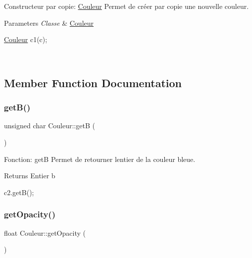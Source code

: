 Constructeur par copie\+: \hyperlink{classCouleur}{Couleur} Permet de créer par copie une nouvelle couleur. 


\begin{DoxyParams}{Parameters}
{\em Classe} & \hyperlink{classCouleur}{Couleur} 
\begin{DoxyCode}
\hyperlink{classCouleur}{Couleur} c1(c);
\end{DoxyCode}
 \\
\hline
\end{DoxyParams}


\subsection{Member Function Documentation}
\mbox{\label{classCouleur_aab24066e81089a96d15bcb04aa2c77df}} 
\subsubsection{\texorpdfstring{get\+B()}{getB()}}
{\footnotesize\ttfamily unsigned char Couleur\+::getB (\begin{DoxyParamCaption}{ }\end{DoxyParamCaption})}



Fonction\+: getB Permet de retourner l\textquotesingle{}entier de la couleur bleue. 

\begin{DoxyReturn}{Returns}
Entier b 
\begin{DoxyCode}
c2.getB();
\end{DoxyCode}
 
\end{DoxyReturn}
\mbox{\label{classCouleur_afb394e815103a2245bc5c3b5b513f05b}} 
\subsubsection{\texorpdfstring{get\+Opacity()}{getOpacity()}}
{\footnotesize\ttfamily float Couleur\+::get\+Opacity (\begin{DoxyParamCaption}{ }\end{DoxyParamCaption})}



